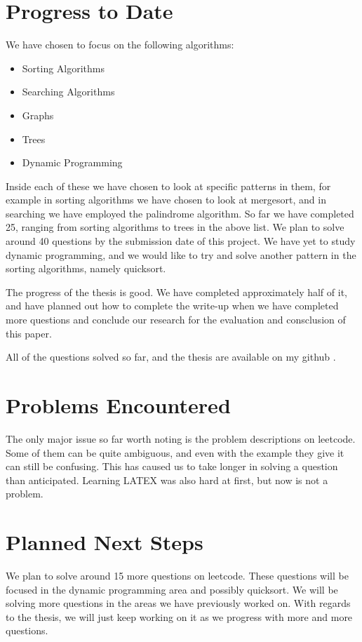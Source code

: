 \documentclass{article}
\begin{document}
\section{Progress to Date}
We have chosen to focus on the following algorithms:
\begin{itemize}
\item Sorting Algorithms
\item Searching Algorithms
\item Graphs
\item Trees
\item Dynamic Programming
\end{itemize}
Inside each of these we have chosen to look at specific patterns in them, for example in sorting algorithms we have chosen to look at mergesort, and in searching we have employed the palindrome algorithm. 
So far we have completed 25, ranging from sorting algorithms to trees in the above list. We plan to solve around 40 questions by the submission date of this project. We have yet to study dynamic programming, and we would like to try and solve another pattern in the sorting algorithms, namely quicksort. 
\par The progress of the thesis is good. We have completed approximately half of it, and have planned out how to complete the write-up when we have completed more questions and conclude our research for the evaluation and consclusion of this paper.
\par All of the questions solved so far, and the thesis are available on my github \cite{gitHub}.  
\section{Problems Encountered}
The only major issue so far worth noting is the problem descriptions on leetcode. Some of them can be quite ambiguous, and even with the example they give it can still be confusing. This has caused us to take longer in solving a question than anticipated. 
Learning LATEX was also hard at first, but now is not a problem.
  
\section{Planned Next Steps}
We plan to solve around 15 more questions on leetcode. These questions will be focused in the dynamic programming area and possibly quicksort. We will be solving more questions in the areas we have previously worked on. 
With regards to the thesis, we will just keep working on it as we progress with more and more questions. 



\end{document}
